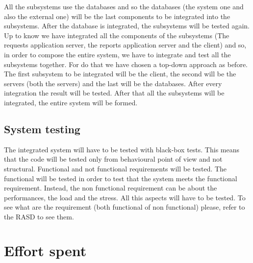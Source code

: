 \documentclass[titlepage]{article}
\begin{document}
All the subsystems use the databases and so the databases (the system one and also the external one) will be the last components to be integrated into the subsystems. After the database is integrated, the subsystems will be tested again.\\

Up to know we have integrated all the components of the subsystems (The requests application server, the reports application server and the client) and so, in order to compose the entire system, we have to integrate and test all the subsystems together. For do that we have chosen a top-down approach as before. The first subsystem to be integrated will be the client, the second will be the servers (both the servers) and the last will be the databases. After every integration the result will be tested. After that all the subsystems will be integrated, the entire system will be formed.

\subsection{System testing}
The integrated system will have to be tested with black-box tests. This means that the code will be tested only from behavioural point of view and not structural. Functional and not functional requirements will be tested. The functional will be tested in order to test that the system meets the functional requirement. Instead, the non functional requirement can be about the performances, the load and the stress. All this aspects will have to be tested. To see what are the requirement (both functional of non functional) please, refer to the RASD to see them. 

\section{Effort spent}
\end{document}
